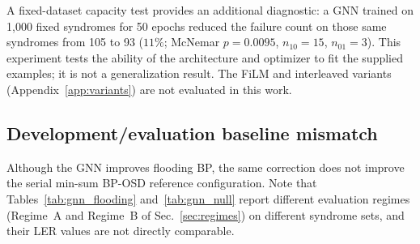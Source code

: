 \documentclass[a4paper,twocolumn,11pt,nopdfoutputerror]{quantumarticle}
\newcommand{\code}[3]{\ensuremath{[\![#1,#2,#3]\!]}}
\begin{document}
A fixed-dataset capacity test provides an additional diagnostic: a GNN
trained on 1{,}000 fixed syndromes for 50 epochs reduced the failure
count on those same syndromes from 105 to 93 ($11\%$; McNemar
$p=0.0095$, $n_{10}=15$, $n_{01}=3$). This experiment tests the ability of
the architecture and optimizer to fit the supplied examples; it is not a
generalization result. The FiLM and interleaved variants
(Appendix~\ref{app:variants}) are not evaluated in this work.

\subsection{Development/evaluation baseline mismatch}\label{sec:mismatch}

Although the GNN improves flooding BP, the same correction does not
improve the serial min-sum BP-OSD reference configuration. Note that Tables~\ref{tab:gnn_flooding}
and~\ref{tab:gnn_null} report different evaluation regimes
(Regime~A and Regime~B of Sec.~\ref{sec:regimes}) on different
syndrome sets, and their LER values are not directly comparable.

\begin{table}[t]
\centering
\caption{GNN+OSD vs.\ serial BP-OSD on $\code{72}{12}{6}$, $\eta=20$,
         20{,}000 identical shots per $p$, five training seeds (ranges
         over seeds). $n_{10}$ ($n_{01}$): shots only BP-OSD (only
         GNN+OSD) fails. Last two columns: seeds for which GNN+OSD is
         significantly worse (McNemar $p<0.05$), unadjusted and after
         Holm correction over the 20 tests. No seed is significantly
         better.}
\label{tab:gnn_null}
\footnotesize
\setlength{\tabcolsep}{2.5pt}
\end{table}
\end{document}
